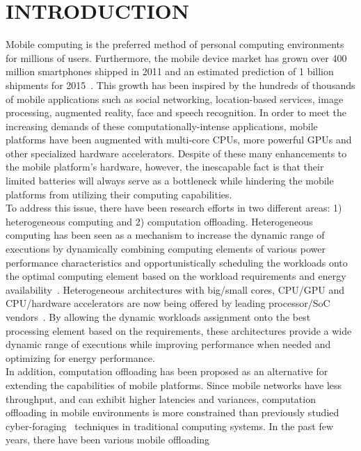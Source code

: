\chapter{INTRODUCTION}
\label{chap:introduction}

Mobile computing is the preferred method of personal computing
environments for millions of users.
%
Furthermore, the mobile device market has grown over 400 million smartphones shipped
in 2011 and an estimated prediction of 1 billion shipments for
2015~\cite{dignan}.
%
This growth has been inspired by the hundreds of thousands of mobile
applications such as social networking, location-based services, image
processing, augmented reality, face and speech recognition.
%
In order to meet the increasing demands of these computationally-intense
applications, mobile platforms have been augmented with multi-core CPUs,
more powerful GPUs and other specialized hardware accelerators.
%
Despite of these many enhancements to the mobile platform's hardware,
however, the inescapable fact is that their limited batteries will
always serve as a bottleneck while hindering the mobile platforms from
utilizing their computing capabilities.\\
%
To address this issue, there have been research efforts in two different
areas: 1) heterogeneous computing and 2) computation offloading.
%
Heterogeneous computing has been seen as a mechanism to increase the
dynamic range of executions by dynamically combining computing elements
of various power performance characteristics and opportunistically scheduling the
workloads onto the optimal computing element based on the workload
requirements and energy availability~\cite{chen}.
%
Heterogeneous architectures with big/small cores, CPU/GPU and
CPU/hardware accelerators are now being offered by leading processor/SoC
vendors~\cite{bigprocessing, tegra}.
%
By allowing the dynamic workloads assignment onto the best processing
element based on the requirements, these architectures provide a wide
dynamic range of executions while improving performance when needed and
optimizing for energy performance.\\
%
In addition, computation offloading has been proposed as an alternative
for extending the capabilities of mobile platforms.
%
Since mobile networks have less throughput, and can exhibit higher
latencies and variances, computation offloading in mobile environments
is more constrained than previously studied cyber-foraging~\cite{cyber}
techniques in traditional computing systems.
%
In the past few years, there have been various mobile offloading
